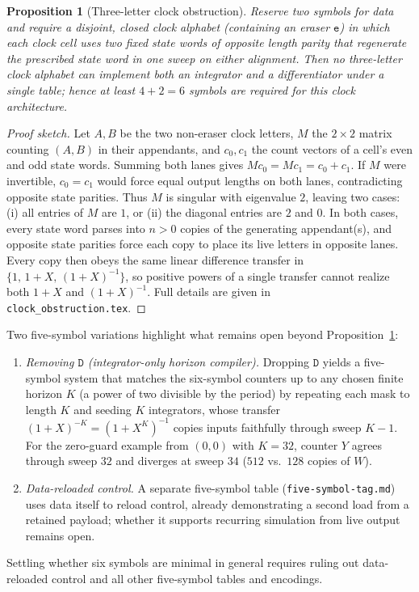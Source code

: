 \documentclass{article}
\newtheorem{proposition}[theorem]{Proposition}
\theoremstyle{definition}
\theoremstyle{remark}
\newcommand{\ttw}[1]{\texttt{#1}}
\begin{document}
\begin{proposition}[Three-letter clock obstruction]\label{prop:obstruction}
Reserve two symbols for data and require a disjoint, closed clock alphabet (containing an eraser $\ttw{e}$) in which each clock cell uses two fixed state words of opposite length parity that regenerate the prescribed state word in one sweep on either alignment.
Then no three-letter clock alphabet can implement both an integrator and a differentiator under a single table; hence at least $4 + 2 = 6$ symbols are required for this clock architecture.
\end{proposition}

\begin{proof}[Proof sketch]
Let $A,B$ be the two non-eraser clock letters, $M$ the $2 \times 2$ matrix counting $(A,B)$ in their appendants, and $c_0, c_1$ the count vectors of a cell's even and odd state words.
Summing both lanes gives $M c_0 = M c_1 = c_0 + c_1$.
If $M$ were invertible, $c_0 = c_1$ would force equal output lengths on both lanes, contradicting opposite state parities.
Thus $M$ is singular with eigenvalue $2$, leaving two cases:
(i) all entries of $M$ are $1$, or
(ii) the diagonal entries are $2$ and $0$.
In both cases, every state word parses into $n > 0$ copies of the generating appendant(s), and opposite state parities force each copy to place its live letters in opposite lanes.
Every copy then obeys the same linear difference transfer in $\{1,\, 1+X,\, (1+X)^{-1}\}$, so positive powers of a single transfer cannot realize both $1+X$ and $(1+X)^{-1}$.
Full details are given in \ttw{clock\_obstruction.tex}.
\end{proof}

Two five-symbol variations highlight what remains open beyond Proposition~\ref{prop:obstruction}:
\begin{enumerate}
\item \emph{Removing $\ttw{D}$ (integrator-only horizon compiler).} Dropping $\ttw{D}$ yields a five-symbol system that matches the six-symbol counters up to any chosen finite horizon $K$ (a power of two divisible by the period) by repeating each mask to length $K$ and seeding $K$ integrators, whose transfer $(1+X)^{-K} = (1+X^K)^{-1}$ copies inputs faithfully through sweep $K-1$. For the zero-guard example from $(0,0)$ with $K=32$, counter $Y$ agrees through sweep $32$ and diverges at sweep $34$ ($512$ vs.\ $128$ copies of $W$).
\item \emph{Data-reloaded control.} A separate five-symbol table (\ttw{five-symbol-tag.md}) uses data itself to reload control, already demonstrating a second load from a retained payload; whether it supports recurring simulation from live output remains open.
\end{enumerate}
Settling whether six symbols are minimal in general requires ruling out data-reloaded control and all other five-symbol tables and encodings.
\end{document}
